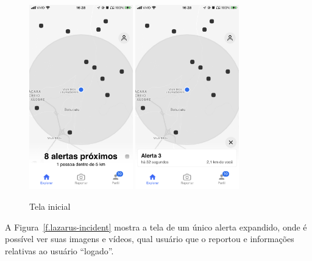 \begin{figure}[htbp]
	\caption{\small Tela inicial} 
	\begin{center}
		\includegraphics[height=8cm]{images/lazarus-explorer-1.png} \quad
		\includegraphics[height=8cm]{images/lazarus-explorer-2.png}
	\end{center}
	\label{f.lazarus-explorer}
\end{figure}

\FloatBarrier

A Figura~\ref{f.lazarus-incident} mostra a tela de um único alerta expandido, onde é possível ver suas imagens e vídeos, qual usuário que o reportou e informações relativas ao usuário ``logado''.

